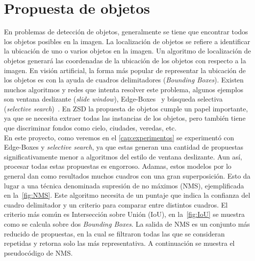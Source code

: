 \section{Propuesta de objetos} \label{sec:propuestadeobjetos}
En problemas de detección de objetos, generalmente se tiene que encontrar todos los objetos posibles en la imagen. La localización de objetos se refiere a identificar la ubicación de uno o varios objetos en la imagen. Un algoritmo de localización de objetos generará las coordenadas de la ubicación de los objetos con respecto a la imagen. En visión artificial, la forma más popular de representar la ubicación de los objetos es con la ayuda de cuadros delimitadores (\textit{Bounding Boxes}). Existen muchos algoritmos y redes que intenta resolver este problema, algunos ejemplos son ventana deslizante (\textit{slide window}), Edge-Boxes~\cite{zitnick2014edge} y búsqueda selectiva (\textit{selective search})~\cite{uijlings2013selective}. En ZSD la propuesta de objetos cumple un papel importante, ya que se necesita extraer todas las instancias de los objetos, pero también tiene que discriminar fondos como cielo, ciudades, veredas, etc.\\

En este proyecto, como veremos en el \autoref{cap:experimentos} se experimentó con Edge-Boxes y \textit{selective search}, ya que estas generan una cantidad de propuestas significativamente menor a algoritmos del estilo de ventana deslizante. Aun así, procesar todas estas propuestas es engorroso. Adamas, estos modelos por lo general dan como resultados muchos cuadros con una gran superposición. Esto da lugar a una técnica denominada supresión de no máximos (NMS), ejemplificada en la~\autoref{fig:NMS}. Este algoritmo necesita de un puntaje que indica la confianza del cuadro delimitador y un criterio para comparar entre distintos cuadros. El criterio más común es Intersección sobre Unión (IoU), en la~\autoref{fig:IoU} se muestra como se calcula sobre dos \textit{Bounding Boxes}. La salida de NMS es un conjunto más reducido de propuestas, en la cual se filtraron todas las que se consideran repetidas y retorna solo las más representativa. A continuación se muestra el pseudocódigo de NMS.

\begin{center}
\noindent{}
\end{center}

